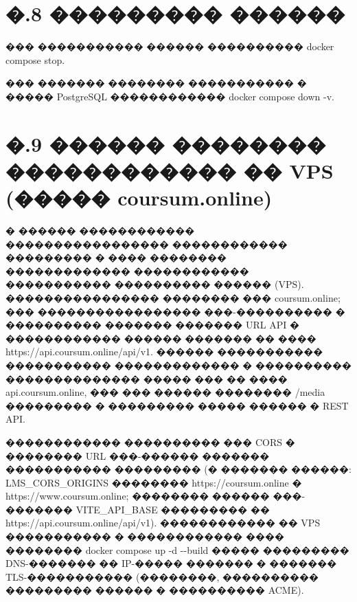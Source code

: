 \section*{�.8 ��������� ������}

��� ����������� ������ ���������� docker compose stop.

��� ������� �������� ����������� � ����� PostgreSQL ������������ docker compose down -v.

\section*{�.9 ������ �������� ������������ �� VPS (����� coursum.online)}

� ������ ������������ ����������������� ������������ ��������� � ���� �������� ������������� ������������ ����������� ���������� ������ (VPS). ���������������� �������� ��� coursum.online; ��� ����������������� ���-���������� � ���������� ������� ������� URL API � ������������ ������ ������� �� ���� https://api.coursum.online/api/v1. ������ ����������� ����������� ������������� � ���������� �������������� ����� ��� �� ���� api.coursum.online, ��� ��� ������ �������� /media ��������� � ��������� ����� ������ � REST API.

������������ ���������� ��� CORS � �������� URL ���-������ ������� ����������� ��������� (� ������� ������: LMS\_CORS\_ORIGINS �������� https://coursum.online � https://www.coursum.online; �������� ������ ���-������� VITE\_API\_BASE ��������� �� https://api.coursum.online/api/v1). ������������ �� VPS ����������� � ������������ ���� �������� docker compose up -d {-}{-}build ����� ��������� DNS-������� �� IP-����� ������� � ������� TLS-����������� (��������, ���������� ��������� ������ � ���������� ACME).
